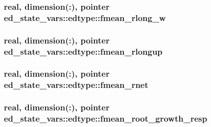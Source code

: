 \subsubsection[{\texorpdfstring{fmean\+\_\+rlong\+\_\+w}{fmean_rlong_w}}]{\setlength{\rightskip}{0pt plus 5cm}real, dimension(\+:), pointer ed\+\_\+state\+\_\+vars\+::edtype\+::fmean\+\_\+rlong\+\_\+w}\hypertarget{structed__state__vars_1_1edtype_a84aaeae4d6d02618686c9181c05dbbeb}{}\label{structed__state__vars_1_1edtype_a84aaeae4d6d02618686c9181c05dbbeb}
\subsubsection[{\texorpdfstring{fmean\+\_\+rlongup}{fmean_rlongup}}]{\setlength{\rightskip}{0pt plus 5cm}real, dimension(\+:), pointer ed\+\_\+state\+\_\+vars\+::edtype\+::fmean\+\_\+rlongup}\hypertarget{structed__state__vars_1_1edtype_ac24a224ad1abada3e8ac72b6ee06aa96}{}\label{structed__state__vars_1_1edtype_ac24a224ad1abada3e8ac72b6ee06aa96}
\subsubsection[{\texorpdfstring{fmean\+\_\+rnet}{fmean_rnet}}]{\setlength{\rightskip}{0pt plus 5cm}real, dimension(\+:), pointer ed\+\_\+state\+\_\+vars\+::edtype\+::fmean\+\_\+rnet}\hypertarget{structed__state__vars_1_1edtype_a75b68a9f2216690cdc48da2906069749}{}\label{structed__state__vars_1_1edtype_a75b68a9f2216690cdc48da2906069749}
\subsubsection[{\texorpdfstring{fmean\+\_\+root\+\_\+growth\+\_\+resp}{fmean_root_growth_resp}}]{\setlength{\rightskip}{0pt plus 5cm}real, dimension(\+:), pointer ed\+\_\+state\+\_\+vars\+::edtype\+::fmean\+\_\+root\+\_\+growth\+\_\+resp}\hypertarget{structed__state__vars_1_1edtype_a00033c711c3a4b9e1a2fe8a097b47859}{}\label{structed__state__vars_1_1edtype_a00033c711c3a4b9e1a2fe8a097b47859}
